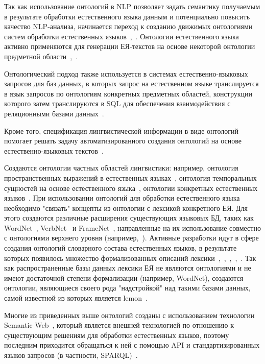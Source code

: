 Так как использование онтологий в NLP позволяет задать семантику получаемым в результате обработки естественного языка данным и потенциально повысить качество NLP-анализа, начинается переход к созданию движимых онтологиями систем обработки естественных языков~\cite{Kostareva2016UsingOM},~\cite{nevzorova_2019}.
Онтологии естественного языка активно применяются для генерации ЕЯ-текстов на основе некоторой онтологии предметной области~\cite{cimiano-etal-2013-exploiting},~\cite{Bouayad_2014}.

Онтологический подход также используется в системах естественно-языковых запросов для баз данных, в которых запрос на естественном языке транслируется в язык запросов по онтологиям конкретных предметных областей, конструкции которого затем транслируются в SQL для обеспечения взаимодействия с реляционными базами данных~\cite{saha_2016}.

Кроме того, спецификация лингвистической информации в виде онтологий помогает решать задачу автоматизированного создания онтологий на основе естественно-языковых текстов~\cite{SHAMSFARD200417}.

Создаются онтологии частных областей лингвистики: например, онтология пространственных выражений в естественных языках~\cite{BATEMAN20101027}, онтология темпоральных сущностей на основе естественного языка~\cite{Moens_1987}, онтологии конкретных естественных языков~\cite{Dobrov_2018}.
При использовании онтологий для обработки естественного языка необходимо "связать"{} концепты из онтологии с лексикой конкретного ЕЯ.
Для этого создаются различные расширения существующих языковых БД, таких как WordNet~\cite{wordnet}, VerbNet~\cite{verbnet} и FrameNet~\cite{framenet}, направленные на их использование совместно с онтологиями верхнего уровня (например,~\cite{pease_fellbaum_2010}).
Активные разработки идут в сфере создания онтологий словарного состава естественных языков, в результате которых появилось множество формализованных описаний лексики~\cite{matsukawa-yokota-1991-development},~\cite{calzolari_1991},~\cite{buitelaar2006linginfo},~\cite{Cimiano2007LexOntoAM},~\cite{buitelaar_2006}.
Так как распространенные базы данных лексики ЕЯ не являются онтологиями и не имеют достаточной степени формализации (например, WordNet), создаются онтологии, являющиеся своего рода "надстройкой"{} над такими базами данных, самой известной из которых является lemon~\cite{McCrae_2012}.

Многие из приведенных выше онтологий созданы с использованием технологии Semantic Web~\cite{sem_web}, который является внешней технологией по отношению к существующим решениям для обработки естественных языков, поэтому последним приходится обращаться к ней с помощью API и стандартизированных языков запросов (в частности, SPARQL)~\cite{Bouayad_2014}.

